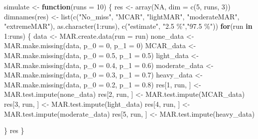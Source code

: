 \documentclass[
]{article}
\newenvironment{Shaded}{\begin{snugshade}}{\end{snugshade}}
\newcommand{\AttributeTok}[1]{\textcolor[rgb]{0.77,0.63,0.00}{#1}}
\newcommand{\ConstantTok}[1]{\textcolor[rgb]{0.00,0.00,0.00}{#1}}
\newcommand{\ControlFlowTok}[1]{\textcolor[rgb]{0.13,0.29,0.53}{\textbf{#1}}}
\newcommand{\DecValTok}[1]{\textcolor[rgb]{0.00,0.00,0.81}{#1}}
\newcommand{\FloatTok}[1]{\textcolor[rgb]{0.00,0.00,0.81}{#1}}
\newcommand{\FunctionTok}[1]{\textcolor[rgb]{0.00,0.00,0.00}{#1}}
\newcommand{\NormalTok}[1]{#1}
\newcommand{\OtherTok}[1]{\textcolor[rgb]{0.56,0.35,0.01}{#1}}
\newcommand{\SpecialCharTok}[1]{\textcolor[rgb]{0.00,0.00,0.00}{#1}}
\newcommand{\StringTok}[1]{\textcolor[rgb]{0.31,0.60,0.02}{#1}}
\begin{document}
\begin{Shaded}
\begin{Highlighting}[]
\NormalTok{simulate }\OtherTok{\textless{}{-}} \ControlFlowTok{function}\NormalTok{(}\AttributeTok{runs =} \DecValTok{10}\NormalTok{) \{}
\NormalTok{  res }\OtherTok{\textless{}{-}} \FunctionTok{array}\NormalTok{(}\ConstantTok{NA}\NormalTok{, }\AttributeTok{dim =} \FunctionTok{c}\NormalTok{(}\DecValTok{5}\NormalTok{, runs, }\DecValTok{3}\NormalTok{))}
  \FunctionTok{dimnames}\NormalTok{(res) }\OtherTok{\textless{}{-}} \FunctionTok{list}\NormalTok{(}\FunctionTok{c}\NormalTok{(}\StringTok{"No\_miss"}\NormalTok{, }\StringTok{"MCAR"}\NormalTok{, }\StringTok{"lightMAR"}\NormalTok{, }\StringTok{"moderateMAR"}\NormalTok{, }\StringTok{"extremeMAR"}\NormalTok{),}
                        \FunctionTok{as.character}\NormalTok{(}\DecValTok{1}\SpecialCharTok{:}\NormalTok{runs),}
                        \FunctionTok{c}\NormalTok{(}\StringTok{"estimate"}\NormalTok{, }\StringTok{"2.5 \%"}\NormalTok{,}\StringTok{"97.5 \%"}\NormalTok{))}
  \ControlFlowTok{for}\NormalTok{(run }\ControlFlowTok{in} \DecValTok{1}\SpecialCharTok{:}\NormalTok{runs) \{}
\NormalTok{    data }\OtherTok{\textless{}{-}} \FunctionTok{MAR.create.data}\NormalTok{(}\AttributeTok{run =}\NormalTok{ run)}
\NormalTok{    none\_data }\OtherTok{\textless{}{-}} \FunctionTok{MAR.make.missing}\NormalTok{(data, }\AttributeTok{p\_0 =} \DecValTok{0}\NormalTok{, }\AttributeTok{p\_1 =} \DecValTok{0}\NormalTok{)}
\NormalTok{    MCAR\_data }\OtherTok{\textless{}{-}} \FunctionTok{MAR.make.missing}\NormalTok{(data, }\AttributeTok{p\_0 =} \FloatTok{0.5}\NormalTok{, }\AttributeTok{p\_1 =} \FloatTok{0.5}\NormalTok{)}
\NormalTok{    light\_data }\OtherTok{\textless{}{-}} \FunctionTok{MAR.make.missing}\NormalTok{(data, }\AttributeTok{p\_0 =} \FloatTok{0.4}\NormalTok{, }\AttributeTok{p\_1 =} \FloatTok{0.6}\NormalTok{)}
\NormalTok{    moderate\_data }\OtherTok{\textless{}{-}} \FunctionTok{MAR.make.missing}\NormalTok{(data, }\AttributeTok{p\_0 =} \FloatTok{0.3}\NormalTok{, }\AttributeTok{p\_1 =} \FloatTok{0.7}\NormalTok{)}
\NormalTok{    heavy\_data }\OtherTok{\textless{}{-}} \FunctionTok{MAR.make.missing}\NormalTok{(data, }\AttributeTok{p\_0 =} \FloatTok{0.2}\NormalTok{, }\AttributeTok{p\_1 =} \FloatTok{0.8}\NormalTok{)}
\NormalTok{    res[}\DecValTok{1}\NormalTok{, run, ] }\OtherTok{\textless{}{-}} \FunctionTok{MAR.test.impute}\NormalTok{(none\_data)}
\NormalTok{    res[}\DecValTok{2}\NormalTok{, run, ] }\OtherTok{\textless{}{-}} \FunctionTok{MAR.test.impute}\NormalTok{(MCAR\_data)}
\NormalTok{    res[}\DecValTok{3}\NormalTok{, run, ] }\OtherTok{\textless{}{-}} \FunctionTok{MAR.test.impute}\NormalTok{(light\_data)}
\NormalTok{    res[}\DecValTok{4}\NormalTok{, run, ] }\OtherTok{\textless{}{-}} \FunctionTok{MAR.test.impute}\NormalTok{(moderate\_data)}
\NormalTok{    res[}\DecValTok{5}\NormalTok{, run, ] }\OtherTok{\textless{}{-}} \FunctionTok{MAR.test.impute}\NormalTok{(heavy\_data)}
    
\NormalTok{  \}}
\NormalTok{  res}
\NormalTok{\}}
\end{Highlighting}
\end{Shaded}
\end{document}
